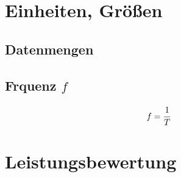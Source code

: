 \documentclass
[
	8pt,		%
	ngerman,	%
	a4paper,	%
	landscape,	%
	final		%
]{extarticle}
\begin{document}
\begin{multicols*}{4}
	\section{Einheiten, Größen}
	\subsection{Datenmengen}
	\begin{center}
		
	\end{center}
	\subsection{Frquenz \(f\)}
	\[f = \cfrac{1}{T}\]
	\section{Leistungsbewertung}
\end{multicols*}
\end{document}

